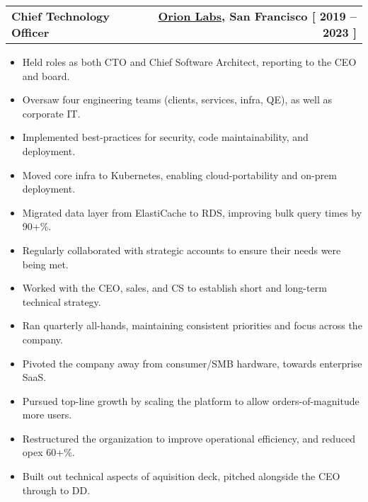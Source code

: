 \documentclass[12pt]{article}
\makeatletter
\newenvironment{justifycolumns}
{\begin{tabular*}{\textwidth}{@{\extracolsep{\fill}} lr@{}}}
{\end{tabular*}}
\newcommand{\row}[2]{#1 & #2 \\}
\newcommand{\rowheading}[2]{\row{\textbf{#1}}{\textbf{#2}}}
\newcommand{\range}[2]{#1 -- #2}
\newcommand{\blockseparation}{\vspace{0.13in}}
\newenvironment{tightbullets}
{\begin{itemize}}
{\end{itemize}}
\newenvironment{bullets}
{\begin{tightbullets}}
{\end{tightbullets} \blockseparation}
\makeatother
\begin{document}
\begin{flushleft}
\begin{justifycolumns}
	\hspace{0.1in}
	\rowheading{Chief Technology Officer}{\textnormal{\href{https://orionlabs.io}{Orion Labs}, San Francisco [ \range{2019}{2023} ]}}
\end{justifycolumns}
\begin{bullets}
	\item Held roles as both CTO and Chief Software Architect, reporting to the CEO and board.
	\item Oversaw four engineering teams (clients, services, infra, QE), as well as corporate IT.
	\item Implemented best-practices for security, code maintainability, and deployment.
	\item Moved core infra to Kubernetes, enabling cloud-portability and on-prem deployment.
	\item Migrated data layer from ElastiCache to RDS, improving bulk query times by 90+\%.
	\item Regularly collaborated with strategic accounts to ensure their needs were being met.
	\item Worked with the CEO, sales, and CS to establish short and long-term technical strategy.
	\item Ran quarterly all-hands, maintaining consistent priorities and focus across the company.
	\item Pivoted the company away from consumer/SMB hardware, towards enterprise SaaS.
	\item Pursued top-line growth by scaling the platform to allow orders-of-magnitude more users.
	\item Restructured the organization to improve operational efficiency, and reduced opex 60+\%.
	\item Built out technical aspects of aquisition deck, pitched alongside the CEO through to DD.
\end{bullets}
\vspace{0.05in}


\end{flushleft}
\end{document}
